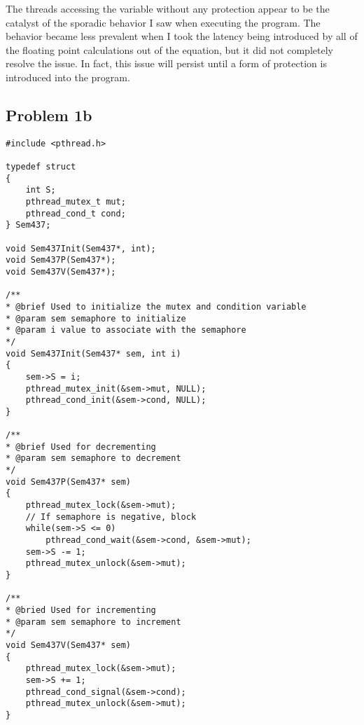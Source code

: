 \documentclass[12pt, a4paper, oneside]{article}
\begin{document}
The threads accessing the variable without any protection appear to be the catalyst of the sporadic behavior I saw when executing the program. The behavior became less prevalent when I took the latency being introduced by all of the floating point calculations out of the equation, but it did not completely resolve the issue. In fact, this issue will persist until a form of protection is introduced into the program.

\subsection*{Problem 1b}

\begin{lstlisting}
#include <pthread.h>

typedef struct
{
    int S;
    pthread_mutex_t mut;
    pthread_cond_t cond;
} Sem437;

void Sem437Init(Sem437*, int);
void Sem437P(Sem437*);
void Sem437V(Sem437*);

/**
* @brief Used to initialize the mutex and condition variable
* @param sem semaphore to initialize
* @param i value to associate with the semaphore
*/
void Sem437Init(Sem437* sem, int i)
{
    sem->S = i;
    pthread_mutex_init(&sem->mut, NULL);
    pthread_cond_init(&sem->cond, NULL);
}

/**
* @brief Used for decrementing
* @param sem semaphore to decrement
*/
void Sem437P(Sem437* sem)
{
    pthread_mutex_lock(&sem->mut);
    // If semaphore is negative, block
    while(sem->S <= 0)
        pthread_cond_wait(&sem->cond, &sem->mut);
    sem->S -= 1;
    pthread_mutex_unlock(&sem->mut);
}

/**
* @bried Used for incrementing
* @param sem semaphore to increment
*/
void Sem437V(Sem437* sem)
{
    pthread_mutex_lock(&sem->mut);
    sem->S += 1;
    pthread_cond_signal(&sem->cond);
    pthread_mutex_unlock(&sem->mut);
}
\end{lstlisting}
\end{document}

